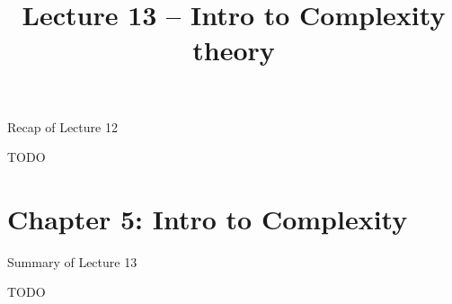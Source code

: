 \documentclass[handout]{beamer}
\title{Lecture 13 -- Intro to Complexity theory}
\begin{document}
\frame{\titlepage}


\begin{frame}{Recap of Lecture 12}
	
    TODO
	
\end{frame}


\section{\sc Chapter 5: Intro to Complexity}


\begin{frame}{Summary of Lecture 13}

    TODO

\end{frame}
\end{document}
